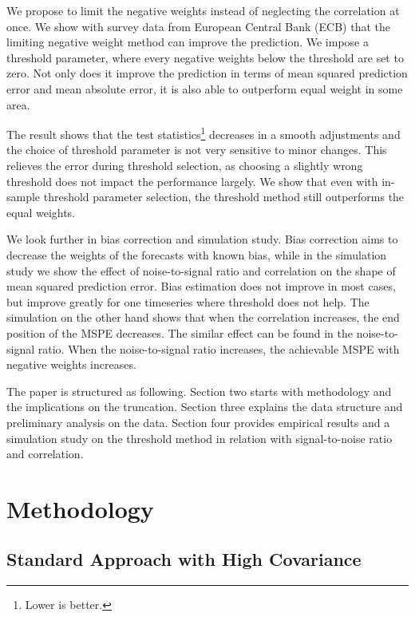 \documentclass[11pt]{article}
\let\rmarkdownfootnote\footnote%
\def\footnote{\protect\rmarkdownfootnote}
\begin{document}
We propose to limit the negative weights instead of neglecting the correlation at once. We show with survey data from European Central Bank (ECB) that the limiting negative weight method can improve the prediction. We impose a threshold parameter, where every negative weights below the threshold are set to zero. Not only does it improve the prediction in terms of mean squared prediction error and mean absolute error, it is also able to outperform equal weight in some area.

The result shows that the test statistics\footnote{Lower is better.} decreases in a smooth adjustments and the choice of threshold parameter is not very sensitive to minor changes. This relieves the error during threshold selection, as choosing a slightly wrong threshold does not impact the performance largely. We show that even with in-sample threshold parameter selection, the threshold method still outperforms the equal weights.

We look further in bias correction and simulation study. Bias correction aims to decrease the weights of the forecasts with known bias, while in the simulation study we show the effect of noise-to-signal ratio and correlation on the shape of mean squared prediction error. Bias estimation does not improve in most cases, but improve greatly for one timeseries where threshold does not help. The simulation on the other hand shows that when the correlation increases, the end position of the MSPE decreases. The similar effect can be found in the noise-to-signal ratio. When the noise-to-signal ratio increases, the achievable MSPE with negative weights increases.

The paper is structured as following. Section two starts with methodology and the implications on the truncation. Section three explains the data structure and preliminary analysis on the data. Section four provides empirical results and a simulation study on the threshold method in relation with signal-to-noise ratio and correlation.

\section{Methodology}\label{methodology}

\subsection{Standard Approach with High Covariance}\label{standard-approach}
\end{document}
